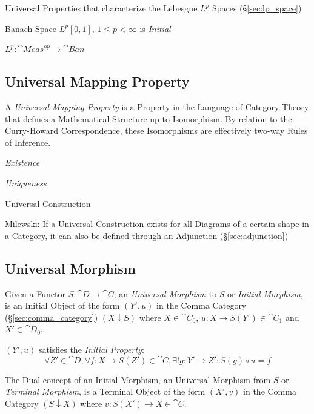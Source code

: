 Universal Properties that characterize the Lebesgue $L^p$ Spaces
(\S\ref{sec:lp_space})

Banach Space $L^p[0,1]$, $1 \leq p < \infty$ is \emph{Initial}

$L^p : \cat{Meas}^{op} \to \cat{Ban}$



\subsection{Universal Mapping Property}
\label{sec:universal_mapping_property}

A \emph{Universal Mapping Property} is a Property in the Language of
Category Theory that defines a Mathematical Structure up to
Isomorphism. By relation to the Curry-Howard Correspondence, these
Isomorphisms are effectively two-way Rules of Inference.

\emph{Existence}

\emph{Uniqueness}

Universal Construction

Milewski: If a Universal Construction exists for all Diagrams of a
certain shape in a Category, it can also be defined through an
Adjunction (\S\ref{sec:adjunction})



\subsection{Universal Morphism}\label{sec:universal_morphism}

Given a Functor $S: \cat{D} \rightarrow \cat{C}$, an
\emph{Universal Morphism} to $S$ or \emph{Initial Morphism}, is an
Initial Object of the form $(Y',u)$ in the Comma Category
(\S\ref{sec:comma_category}) $(X \downarrow S)$ where $X \in
\cat{C}_0$, $u : X \rightarrow S(Y') \in \cat{C}_1$ and $X' \in
\cat{D}_0$.

$(Y', u)$ satisfies the \emph{Initial Property}:
\[
  \forall Z' \in \cat{D}, \forall f : X \rightarrow S(Z') \in
  \cat{C}, \exists! g : Y' \rightarrow Z' : S(g) \circ u = f
\]

The Dual concept of an Initial Morphism, an Universal Morphism from
$S$ or \emph{Terminal Morphism}, is a Terminal Object of the form
$(X',v)$ in the Comma Category $(S \downarrow X)$ where $v : S(X')
\rightarrow X \in \cat{C}$.


